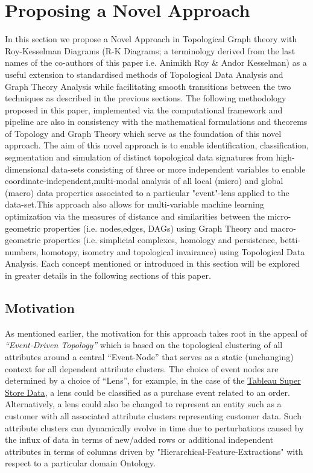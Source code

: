 \section{Proposing a Novel Approach}

In this section we propose a Novel Approach in Topological Graph theory with Roy-Kesselman Diagrams (R-K Diagrams; a terminology derived from the last names of the co-authors of this paper i.e. Animikh Roy \& Andor Kesselman) as a useful extension to standardised methods of Topological Data Analysis and Graph Theory Analysis while facilitating smooth transitions between the two techniques as described in the previous sections. The following methodology proposed in this paper, implemented via the computational framework and pipeline are also in consistency with the mathematical formulations and theorems of Topology and Graph Theory which serve as the foundation of this novel approach. The aim of this novel approach is to enable identification, classification, segmentation and simulation of distinct topological data signatures from high-dimensional data-sets consisting of three or more independent variables to enable coordinate-independent,multi-modal analysis of all local (micro) and global (macro) data properties associated to a particular "event"-lens applied to the data-set.This approach also allows for multi-variable machine learning optimization via the measures of distance and similarities between the micro-geometric properties (i.e. nodes,edges, DAGs) using Graph Theory and macro-geometric properties (i.e. simplicial complexes, homology and persistence, betti-numbers, homotopy, isometry and topological invairance) using Topological Data Analysis. Each concept mentioned or introduced in this section will be explored in greater details in the following sections of this paper.

\subsection{Motivation}

As mentioned earlier, the motivation for this approach takes root in the appeal of \textit{“Event-Driven Topology”} which is based on the topological clustering of all attributes around a central ``Event-Node'' that serves as a static (unchanging) context for all dependent attribute clusters. The choice of event nodes are determined by a choice of ``Lens'', for example, in the case of the \hyperref[sec:store_sales_section]{Tableau Super Store Data}, a lens could be classified as a purchase event related to an order. Alternatively, a lens could also be changed to represent an entity such as a customer with all associated attribute clusters representing customer data. Such attribute clusters can dynamically evolve in time due to perturbations caused by the influx of data in terms of new/added rows or additional independent attributes in terms of columns driven by "Hierarchical-Feature-Extractions" with respect to a particular domain Ontology.


